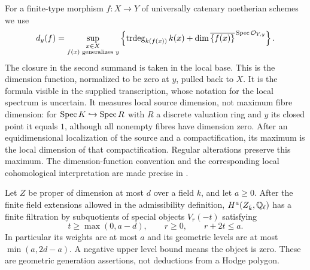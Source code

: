 \begin{definition}
\label{c:local-dimension}
For a finite-type morphism $f:X\to Y$ of universally catenary noetherian schemes we use
\[
 d_y(f)=\sup_{\substack{x\in X\\ f(x)\text{ generalizes }y}}
 \left\{\operatorname{trdeg}_{k(f(x))}k(x)
       +\dim\overline{\{f(x)\}}^{\,\operatorname{Spec}\mathcal O_{Y,y}}\right\}.
\]
The closure in the second summand is taken in the local base. This is the dimension function, normalized to be zero at $y$, pulled back to $X$. It is the formula visible in the supplied transcription, whose notation for the local spectrum is uncertain. It measures local source dimension, not maximum fibre dimension: for $\operatorname{Spec} K\hookrightarrow\operatorname{Spec} R$ with $R$ a discrete valuation ring and $y$ its closed point it equals $1$, although all nonempty fibres have dimension zero. After an equidimensional localization of the source and a compactification, its maximum is the local dimension of that compactification. Regular alterations preserve this maximum. The dimension-function convention and the corresponding local cohomological interpretation are made precise in \citet[\S1.1.1 and Corollary 1.2.2]{c_pillonistroh2014}.
\end{definition}

\begin{lemma}
\label{c:proper-level}
Let $Z$ be proper of dimension at most $d$ over a field $k$, and let $a\geq0$. After the finite field extensions allowed in the admissibility definition, $H^a(Z_{\bar k},\mathbb Q_\ell)$ has a finite filtration by subquotients of special objects $V_r(-t)$ satisfying
\[
 t\geq\max(0,a-d),\qquad r\geq0,\qquad r+2t\leq a.
\]
In particular its weights are at most $a$ and its geometric levels are at most $\min(a,2d-a)$. A negative upper level bound means the object is zero. These are geometric generation assertions, not deductions from a Hodge polygon.
\end{lemma}

